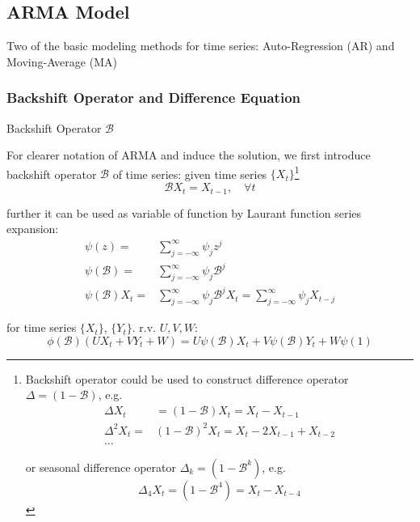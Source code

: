         


\subsection{ARMA Model}
    Two of the basic modeling methods for time series: Auto-Regression (AR) and Moving-Average (MA)
    
\subsubsection{Backshift Operator and Difference Equation}

\begin{point}
    Backshift Operator $ \mathscr{B}  $
\end{point}

    For clearer notation of ARMA and induce the solution, we first introduce backshift operator $ \mathscr{B}  $ of time series: given time series $ \{X_t\} $\footnote{Backshift operator could be used to construct difference operator $ \Delta =(1-\mathscr{B} ) $, e.g.
    \begin{align}
        \Delta X_t&=(1-\mathscr{B} )X_t=X_t-X_{t-1}\\
        \Delta ^2X_t=&(1-\mathscr{B} )^2X_t=X_t-2X_{t-1}+X_{t-2}\\
        \ldots&
    \end{align}
    
    or seasonal difference operator $ \Delta _k=(1-\mathscr{B} ^k) $, e.g.
    \begin{equation}
        \Delta _4X_t=(1-\mathscr{B} ^4)=X_t-X_{t-4} 
    \end{equation}
    
    }
    \begin{equation}
         \mathscr{B} X_t=X_{t-1},\quad \forall t
    \end{equation}
    
    further it can be used as variable of function by Laurant function series expansion:
    \begin{align}
        \psi (z)=&\sum_{j=-\infty}^\infty \psi _{j}z^j\\
        \psi (\mathscr{B} )=&\sum_{j=-\infty}^\infty \psi _{j}\mathscr{B}^j \\
        \psi (\mathscr{B} )X_t=&\sum_{j=-\infty}^\infty \psi _{j}\mathscr{B}^jX_t=\sum_{j=-\infty}^\infty \psi _{j}X_{t-j}
    \end{align} 

    for time series $ \{X_t\} $, $ \{Y_t\} $. r.v. $ U,V,W $:
    \begin{equation}
        \phi (\mathscr{B} )(UX_t+VY_t+W)=U\psi (\mathscr{B} )X_t+V\psi (\mathscr{B} )Y_t+W\psi (1) 
    \end{equation}

